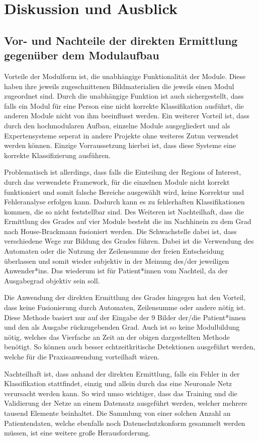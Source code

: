 \chapter{Diskussion und Ausblick}\label{discussion}
\section{Vor- und Nachteile der direkten Ermittlung gegenüber dem Modulaufbau}\label{di_vs_module}
Vorteile der Modulform ist, die unabhängige Funktionalität der Module. Diese haben ihre jeweils zugeschnittenen Bildmaterialien die jeweils einen Modul zugeordnet sind. Durch die unabhängige Funktion ist auch sichergestellt, dass falls ein Modul für eine Person eine nicht korrekte Klassifikation ausführt, die anderen Module nicht von ihm beeinflusst werden. Ein weiterer Vorteil ist, dass durch den hochmodularen Aufbau, einzelne Module ausgegliedert und als Expertensysteme seperat in andere Projekte ohne weiteres Zutun verwendet werden können. Einzige Vorraussetzung hierbei ist, dass diese Systeme eine korrekte Klassifizierung ausführen.

Problematisch ist allerdings, dass falls die Einteilung der Regions of Interest, durch das verwendete Framework, für die einzelnen Module nicht korrekt funktioniert und somit falsche Bereiche ausgewählt wird, keine Korrektur und Fehleranalyse erfolgen kann. Dadurch kann es zu fehlerhaften Klassifikationen kommen, die so nicht feststellbar sind. Des Weiteren ist Nachteilhaft, dass die Ermittlung des Grades auf vier Module besteht die im Nachhinein zu dem Grad nach House-Brackmann fusioniert werden. Die Schwachstelle dabei ist, dass verschiedene Wege zur Bildung des Grades führen. Dabei ist die Verwendung des Automaten oder die Nutzung der Zeilensumme der freien Entscheidung überlassen und somit wieder subjektiv in der Meinung des/der jeweiligen Anwender*ins. Das wiederum ist für Patient*innen vom Nachteil, da der Ausgabegrad objektiv sein soll.

Die Anwendung der direkten Ermittlung des Grades hingegen hat den Vorteil, dass keine Fusionierung durch Automaten, Zeilensumme oder andere nötig ist. Diese Methode basiert nur auf der Eingabe der 9 Bilder der/die Patient*innen und den als Ausgabe rückzugebenden Grad. Auch ist so keine Modulbildung nötig, welches das Vierfache an Zeit an der obigen dargestellten Methode benötigt. So können auch besser echtzeitkritische Detektionen ausgeführt werden, welche für die Praxisanwendung vorteilhaft wären.

Nachteilhaft ist, dass anhand der direkten Ermittlung, falls ein Fehler in der Klassifikation stattfindet, einzig und allein durch das eine Neuronale Netz verursacht werden kann. So wird umso wichtiger, dass das Training und die Validierung der Netze an einem Datensatz ausgeführt werden, welcher mehrere tausend Elemente beinhaltet. Die Sammlung von einer solchen Anzahl an Patientendaten, welche ebenfalls noch Datenschutzkonform gesammelt werden müssen, ist eine weitere große Herausforderung.


